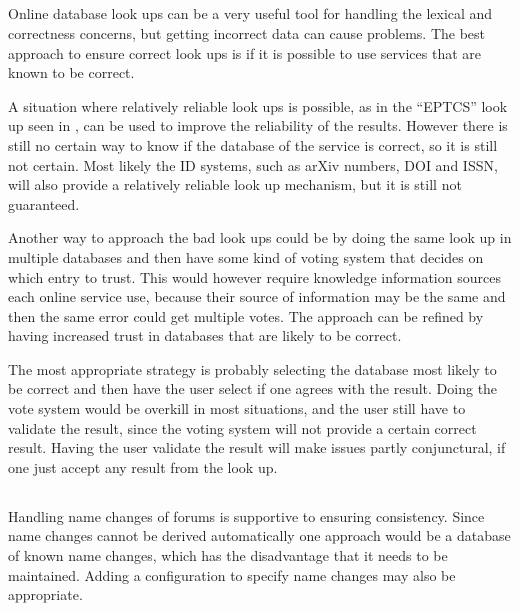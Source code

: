\subsection{}
\label{sec:approach_look_ups}

Online database look ups can be a very useful tool for handling the
lexical and correctness concerns, but getting incorrect data can cause
problems.  The best approach to ensure correct look ups is if it is
possible to use services that are known to be correct.

A situation where relatively reliable look ups is possible, as in the
``EPTCS'' look up seen in , can be used to
improve the reliability of the results.  However there is still no
certain way to know if the database of the service is correct, so it
is still not certain.  Most likely the ID systems, such as arXiv
numbers, DOI and ISSN, will also provide a relatively reliable look up
mechanism, but it is still not guaranteed.

Another way to approach the bad look ups could be by doing the same
look up in multiple databases and then have some kind of voting system
that decides on which entry to trust.  This would however require
knowledge information sources each online service use, because their
source of information may be the same and then the same error could
get multiple votes.  The approach can be refined by having increased
trust in databases that are likely to be correct.

The most appropriate strategy is probably selecting the database most
likely to be correct and then have the user select if one agrees with
the result.  Doing the vote system would be overkill in most
situations, and the user still have to validate the result, since the
voting system will not provide a certain correct result.  Having the
user validate the result will make issues partly conjunctural, if one
just accept any result from the look up.


\subsection{}

Handling name changes of forums is supportive to ensuring consistency.
Since name changes cannot be derived automatically one approach would
be a database of known name changes, which has the disadvantage that
it needs to be maintained.  Adding a configuration to specify name
changes may also be appropriate.


